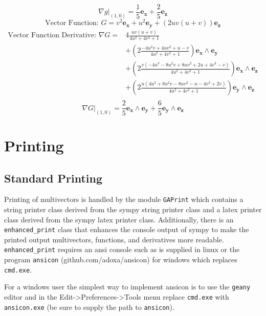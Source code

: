 \documentclass[10pt]{article}
\newcommand{\W}{\wedge}
\newcommand{\eval}[2]{\left . {#1} \right |_{#2}}
\newcommand{\T}[1]{\texttt{#1}}
\begin{document}
\begin{equation*} \eval{\nabla g}{(1,0)} = \frac{1}{5}\bm{e_{x}}+\frac{2}{5}\bm{e_{z}} \end{equation*}
\begin{equation*} \mbox{Vector Function: } G = v^{2}\bm{e_{x}}+u^{2}\bm{e_{y}}+\left ( 2 u v \left(u + v\right)\right ) \bm{e_{z}} \end{equation*}
 \begin{align*} \mbox{Vector Function Derivative: } \nabla G =  & 4 \frac{u v \left(u + v\right)}{4 u^{2} + 4 v^{2} + 1} \\  & +\left ( 2 \frac{- 4 u^{2} v + 4 u v^{2} + u - v}{4 u^{2} + 4 v^{2} + 1}\right ) \bm{e_{x}\W e_{y}} \\  & +\left ( 2 \frac{v \left(- 4 u^{3} - 8 u^{2} v + 8 u v^{2} + 2 u + 4 v^{3} - v\right)}{4 u^{2} + 4 v^{2} + 1}\right ) \bm{e_{x}\W e_{z}} \\  & +\left ( 2 \frac{u \left(4 u^{3} + 8 u^{2} v - 8 u v^{2} - u - 4 v^{3} + 2 v\right)}{4 u^{2} + 4 v^{2} + 1}\right ) \bm{e_{y}\W e_{z}} \\ \end{align*} 
\begin{equation*} \eval{\nabla G}{(1,0)} = \frac{2}{5}\bm{e_{x}\W e_{y}}+\frac{6}{5}\bm{e_{y}\W e_{z}} \end{equation*}

\section{Printing}

\subsection{Standard Printing}

Printing of multivectors is handled by the module \T{GAPrint} which contains
a string printer class derived from the sympy string printer class and a latex
printer class derived from the sympy latex printer class.  Additionally, there
is an \T{enhanced\_print} class that enhances the console output of sympy to make
the printed output multivectors, functions, and derivatives more readable.
\T{enhanced\_print} requires an ansi console such as is supplied in linux or the
program \T{ansicon} (github.com/adoxa/ansicon) for windows which replaces \T{cmd.exe}.

For a windows user the simplest way to implement ansicon is to use the \T{geany}
editor and in the Edit->Preferences->Tools menu replace \T{cmd.exe} with
\T{ansicon.exe} (be sure to supply the path to \T{ansicon}).
\end{document}
